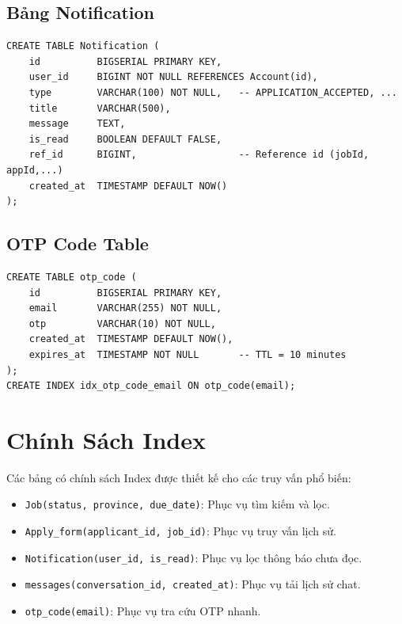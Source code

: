 \documentclass[12pt, a4paper]{report}
\begin{document}
\subsection{Bảng Notification}

\begin{lstlisting}[style=sqlstyle]
CREATE TABLE Notification (
    id          BIGSERIAL PRIMARY KEY,
    user_id     BIGINT NOT NULL REFERENCES Account(id),
    type        VARCHAR(100) NOT NULL,   -- APPLICATION_ACCEPTED, ...
    title       VARCHAR(500),
    message     TEXT,
    is_read     BOOLEAN DEFAULT FALSE,
    ref_id      BIGINT,                  -- Reference id (jobId, appId,...)
    created_at  TIMESTAMP DEFAULT NOW()
);
\end{lstlisting}

\subsection{OTP Code Table}

\begin{lstlisting}[style=sqlstyle]
CREATE TABLE otp_code (
    id          BIGSERIAL PRIMARY KEY,
    email       VARCHAR(255) NOT NULL,
    otp         VARCHAR(10) NOT NULL,
    created_at  TIMESTAMP DEFAULT NOW(),
    expires_at  TIMESTAMP NOT NULL       -- TTL = 10 minutes
);
CREATE INDEX idx_otp_code_email ON otp_code(email);
\end{lstlisting}

\section{Chính Sách Index}

Các bảng có chính sách Index được thiết kế cho các truy vấn phổ biến:

\begin{itemize}
    \item \texttt{Job(status, province, due\_date)}: Phục vụ tìm kiếm và lọc.
    \item \texttt{Apply\_form(applicant\_id, job\_id)}: Phục vụ truy vấn lịch sử.
    \item \texttt{Notification(user\_id, is\_read)}: Phục vụ lọc thông báo chưa đọc.
    \item \texttt{messages(conversation\_id, created\_at)}: Phục vụ tải lịch sử chat.
    \item \texttt{otp\_code(email)}: Phục vụ tra cứu OTP nhanh.
\end{itemize}

\end{document}
